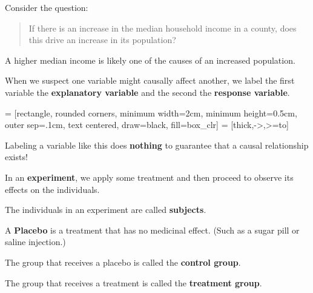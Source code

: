 \documentclass{beamer}
\begin{document}
\begin{frame}
\begin{example}
Consider the question:
\blockquote{If there is an increase in the median household income in a county, does this drive an increase in its population?}\pause

A higher median income is likely one of the causes of an increased population.
\end{example}\pause

\begin{definition}
When we suspect one variable might causally affect another, we label the first variable the \textbf{explanatory variable} and the second the \textbf{response variable}.
\vspace{-4mm}
\begin{center}
 = [rectangle, rounded corners, minimum width=2cm, minimum height=0.5cm, outer sep=.1cm, text centered, draw=black, fill=box_clr]
 = [thick,->,>=to]
\end{center}
\end{definition}\pause

\begin{note}
Labeling a variable like this does \textbf{nothing} to guarantee that a causal relationship exists!
\end{note}
\end{frame}

\begin{frame}
\begin{definition}
In an \textbf{experiment}, we apply some treatment and then proceed to observe its effects on the individuals.
\end{definition}\pause

\begin{definition}
The individuals in an experiment are called \textbf{subjects}.
\end{definition}\pause

\begin{definition}
A \textbf{Placebo} is a treatment that has no medicinal effect. (Such as a sugar pill or saline injection.)
\end{definition}\pause

\begin{definition}
The group that receives a placebo is called the \textbf{control group}.
\end{definition}\pause

\begin{definition}
The group that receives a treatment is called the \textbf{treatment group}.
\end{definition}
\end{frame}
\end{document}
